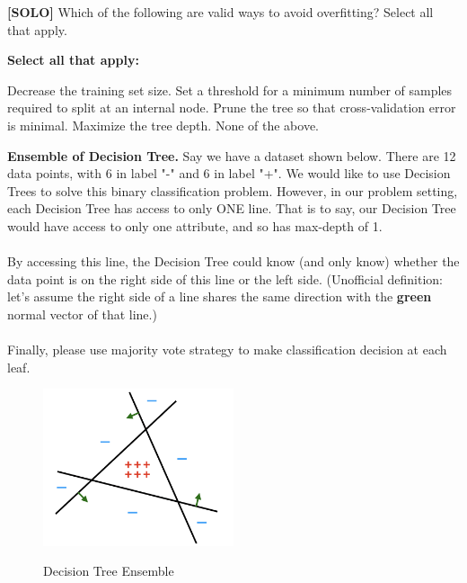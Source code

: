 \documentclass[11pt,addpoints,answers]{exam}
\begin{document}
\begin{questions}
    
    
    
    \question[2] \textbf{[SOLO]} Which of the following are valid ways to avoid overfitting? Select all that apply.

    \textbf{Select all that apply:}
    {
    \checkboxchar{$\Box$} \checkedchar{$\blacksquare$}
    \begin{checkboxes}
        \choice Decrease the training set size. 
        \choice Set a threshold for a minimum number of samples required to split at an internal node. 
        \choice Prune the tree so that cross-validation error is minimal. 
        \choice Maximize the tree depth.
        \choice None of the above.
    \end{checkboxes}
    }

    
    \clearpage
    
    \question[3] \textbf{Ensemble of Decision Tree.} Say we have a dataset shown below. There are 12 data points, with 6 in label "-" and 6 in label "+". We would like to use Decision Trees to solve this binary classification problem. However, in our problem setting, each Decision Tree has access to only ONE line. That is to say, our Decision Tree would have access to only one attribute, and so has max-depth of 1. \\ \\
    By accessing this line, the Decision Tree could know (and only know) whether the data point is on the right side of this line or the left side. (Unofficial definition: let's assume the right side of a line shares the same direction with the \textcolor{OliveGreen}{\textbf{green}} normal vector of that line.) \\ \\
    Finally, please use majority vote strategy to make classification decision at each leaf.\\
    
    \begin{figure}[H]
        \centering
        \includegraphics[width = 0.5\textwidth]{images/ensemble_dt.png}
        \label{Q_ensemble_DT}
        \caption{Decision Tree Ensemble \label{fig:ensemble}}
    \end{figure}
    

\end{questions}
\end{document}
